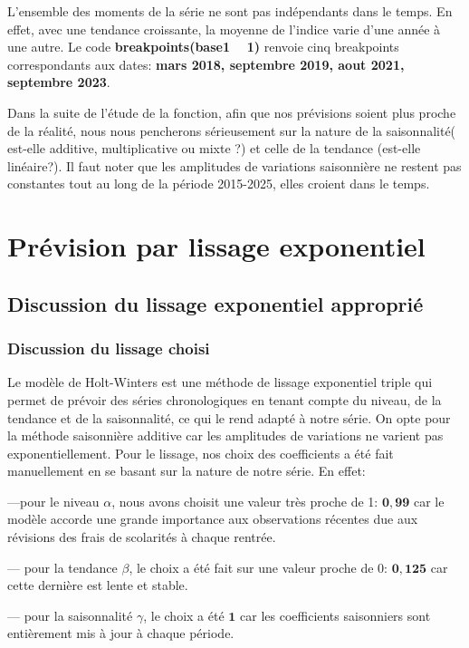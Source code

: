 \documentclass[
12pt,          %
a4paper,       %
oneside,       %
openright      %
]{report}
\begin{document}
L’ensemble des moments de la série ne sont pas indépendants dans le temps. En effet, avec une tendance croissante, la moyenne de l'indice varie d'une année à une autre. Le code   \textbf{ breakpoints(base1 ~ 1)} renvoie  cinq breakpoints correspondants aux dates:  \textbf{mars 2018, septembre 2019, aout 2021, septembre 2023}. 


 Dans la suite de l'étude de la fonction, afin que nos prévisions soient plus proche de la réalité, nous nous pencherons sérieusement sur la nature de la saisonnalité( est-elle additive, multiplicative ou mixte ?) et celle de la tendance (est-elle linéaire?). 
 Il faut noter que les amplitudes de variations saisonnière ne restent pas constantes tout au long de la période 2015-2025, elles croient dans le temps. 
  
 \chapter{Prévision par lissage exponentiel}
 
 \section{ Discussion du lissage exponentiel approprié}
 
 
 \subsection{Discussion du lissage choisi}
 
Le modèle de Holt-Winters est une méthode de lissage exponentiel triple qui permet de prévoir des séries chronologiques en tenant compte du niveau, de la tendance et de la saisonnalité, ce qui le rend adapté à notre série. On opte pour la méthode saisonnière additive car les amplitudes de variations ne varient pas exponentiellement. 
Pour le lissage, nos choix des coefficients a été fait manuellement en se basant sur la nature de notre série. En effet: 

---pour le niveau $\alpha$, nous avons choisit une valeur très proche de 1: $\mathbf{0{,}99}$ car le modèle accorde une grande importance aux observations récentes due aux révisions des frais de scolarités à chaque rentrée. 

--- pour la tendance $\beta$, le choix a été fait sur une valeur proche de 0: $\mathbf{0{,}125}$ car cette dernière est lente et stable.  

--- pour la saisonnalité $\gamma$,  le choix a été $\mathbf{1}$ car les coefficients saisonniers sont entièrement mis à jour à chaque période. 
\end{document}
